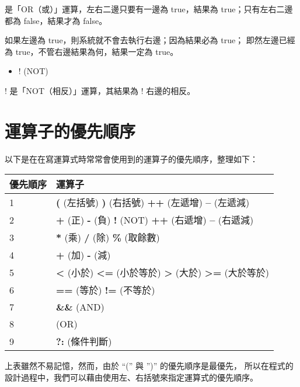 \documentclass[a4paper,12pt,english]{sphinxmanual}
\begin{document}
\textbar{}\textbar{} 是「OR（或）」運算，左右二邊只要有一邊為 true，結果為 true；只有左右二邊都為 false，結果才為 false。

如果左邊為 true，則系統就不會去執行右邊；因為結果必為 true；
即然左邊已經為 true，不管右邊結果為何，結果一定為 true。
\begin{itemize}
\item {} 
! (NOT)

\end{itemize}

! 是「NOT（相反）」運算，其結果為 ! 右邊的相反。


\section{運算子的優先順序}
\label{java_cond:id4}
以下是在在寫運算式時常常會使用到的運算子的優先順序，整理如下：

\begin{tabulary}{\linewidth}{|L|L|}
\hline
\textbf{
優先順序
} & \textbf{
運算子
}\\
\hline

1
 & 
\textbf{(} (左括號)  \textbf{)} (右括號) \textbf{++} (左遞增) \textbf{--} (左遞減)
\\

2
 & 
\textbf{+} (正) \textbf{-} (負) \textbf{!} (NOT) \textbf{++} (右遞增) \textbf{--} (右遞減)
\\

3
 & 
\textbf{*} (乘) \textbf{/} (除) \textbf{\%} (取餘數)
\\

4
 & 
\textbf{+} (加) \textbf{-} (減)
\\

5
 & 
\textbf{\textless{}} (小於) \textbf{\textless{}=} (小於等於) \textbf{\textgreater{}} (大於) \textbf{\textgreater{}=} (大於等於)
\\

6
 & 
\textbf{==} (等於) \textbf{!=} (不等於)
\\

7
 & 
\textbf{\&\&} (AND)
\\

8
 & 
\textbf{\textbar{}\textbar{}} (OR)
\\

9
 & 
\textbf{?:} (條件判斷)
\\
\hline
\end{tabulary}


上表雖然不易記憶，然而，由於 ``('' 與 '')'' 的優先順序是最優先，
所以在程式的設計過程中，我們可以藉由使用左、右括號來指定運算式的優先順序。
\end{document}
